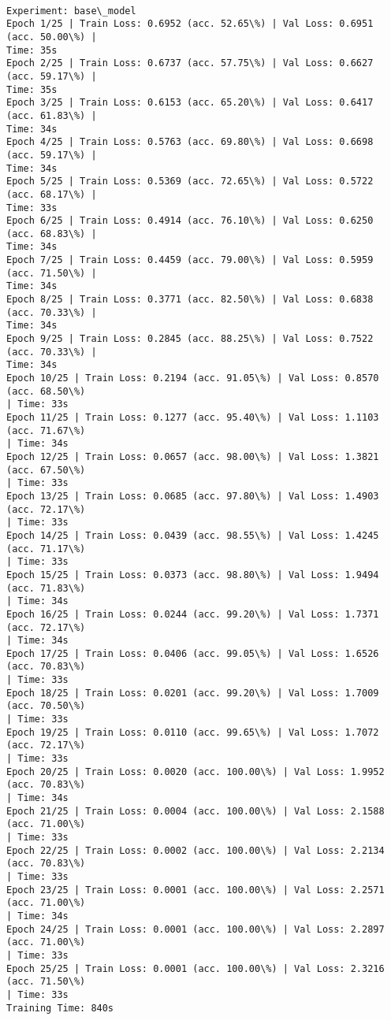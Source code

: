 \documentclass[8pt]{extarticle}
\begin{document}
    \begin{Verbatim}[commandchars=\\\{\}]

Experiment: base\_model
Epoch 1/25 | Train Loss: 0.6952 (acc. 52.65\%) | Val Loss: 0.6951 (acc. 50.00\%) |
Time: 35s
Epoch 2/25 | Train Loss: 0.6737 (acc. 57.75\%) | Val Loss: 0.6627 (acc. 59.17\%) |
Time: 35s
Epoch 3/25 | Train Loss: 0.6153 (acc. 65.20\%) | Val Loss: 0.6417 (acc. 61.83\%) |
Time: 34s
Epoch 4/25 | Train Loss: 0.5763 (acc. 69.80\%) | Val Loss: 0.6698 (acc. 59.17\%) |
Time: 34s
Epoch 5/25 | Train Loss: 0.5369 (acc. 72.65\%) | Val Loss: 0.5722 (acc. 68.17\%) |
Time: 33s
Epoch 6/25 | Train Loss: 0.4914 (acc. 76.10\%) | Val Loss: 0.6250 (acc. 68.83\%) |
Time: 34s
Epoch 7/25 | Train Loss: 0.4459 (acc. 79.00\%) | Val Loss: 0.5959 (acc. 71.50\%) |
Time: 34s
Epoch 8/25 | Train Loss: 0.3771 (acc. 82.50\%) | Val Loss: 0.6838 (acc. 70.33\%) |
Time: 34s
Epoch 9/25 | Train Loss: 0.2845 (acc. 88.25\%) | Val Loss: 0.7522 (acc. 70.33\%) |
Time: 34s
Epoch 10/25 | Train Loss: 0.2194 (acc. 91.05\%) | Val Loss: 0.8570 (acc. 68.50\%)
| Time: 33s
Epoch 11/25 | Train Loss: 0.1277 (acc. 95.40\%) | Val Loss: 1.1103 (acc. 71.67\%)
| Time: 34s
Epoch 12/25 | Train Loss: 0.0657 (acc. 98.00\%) | Val Loss: 1.3821 (acc. 67.50\%)
| Time: 33s
Epoch 13/25 | Train Loss: 0.0685 (acc. 97.80\%) | Val Loss: 1.4903 (acc. 72.17\%)
| Time: 33s
Epoch 14/25 | Train Loss: 0.0439 (acc. 98.55\%) | Val Loss: 1.4245 (acc. 71.17\%)
| Time: 33s
Epoch 15/25 | Train Loss: 0.0373 (acc. 98.80\%) | Val Loss: 1.9494 (acc. 71.83\%)
| Time: 34s
Epoch 16/25 | Train Loss: 0.0244 (acc. 99.20\%) | Val Loss: 1.7371 (acc. 72.17\%)
| Time: 34s
Epoch 17/25 | Train Loss: 0.0406 (acc. 99.05\%) | Val Loss: 1.6526 (acc. 70.83\%)
| Time: 33s
Epoch 18/25 | Train Loss: 0.0201 (acc. 99.20\%) | Val Loss: 1.7009 (acc. 70.50\%)
| Time: 33s
Epoch 19/25 | Train Loss: 0.0110 (acc. 99.65\%) | Val Loss: 1.7072 (acc. 72.17\%)
| Time: 33s
Epoch 20/25 | Train Loss: 0.0020 (acc. 100.00\%) | Val Loss: 1.9952 (acc. 70.83\%)
| Time: 34s
Epoch 21/25 | Train Loss: 0.0004 (acc. 100.00\%) | Val Loss: 2.1588 (acc. 71.00\%)
| Time: 33s
Epoch 22/25 | Train Loss: 0.0002 (acc. 100.00\%) | Val Loss: 2.2134 (acc. 70.83\%)
| Time: 33s
Epoch 23/25 | Train Loss: 0.0001 (acc. 100.00\%) | Val Loss: 2.2571 (acc. 71.00\%)
| Time: 34s
Epoch 24/25 | Train Loss: 0.0001 (acc. 100.00\%) | Val Loss: 2.2897 (acc. 71.00\%)
| Time: 33s
Epoch 25/25 | Train Loss: 0.0001 (acc. 100.00\%) | Val Loss: 2.3216 (acc. 71.50\%)
| Time: 33s
Training Time: 840s
    \end{Verbatim}
\end{document}

